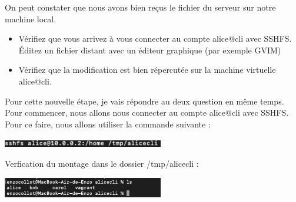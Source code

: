 \documentclass[12pt]{article}
\begin{document}
\vspace{0.3cm}

On peut constater que nous avons bien reçus le fichier du serveur sur notre machine local.

\vspace{0.3cm}

\begin{itemize}
  \item Vérifiez que vous arrivez à vous connecter au compte alice@cli avec SSHFS. \\
  Éditez un fichier distant avec un éditeur graphique (par exemple GVIM)
\end{itemize}

\vspace{0.3cm}

\begin{itemize}
    \item Vérifiez que la modification est bien répercutée sur la machine virtuelle alice@cli.
\end{itemize}

\vspace{0.3cm}

Pour cette nouvelle étape, je vais répondre au deux question en même temps. Pour commencer, nous allons nous connecter au compte alice@cli avec SSHFS. Pour ce faire, nous allons utiliser la commande suivante : 

\vspace{0.3cm}

\begin{center}
  \includegraphics[width=7cm]{Image-TD-SSH-4/sshfs.png}
\end{center}

\vspace{0.3cm}

Verfication du montage dans le dossier /tmp/alicecli : 

\vspace{0.3cm}

\begin{center}
  \includegraphics[width=7cm]{Image-TD-SSH-4/montage-sshfs.png}
\end{center}

\vspace{0.3cm}
\end{document}
